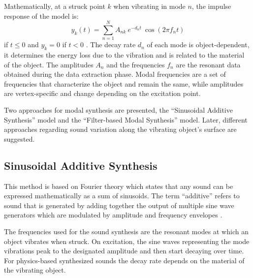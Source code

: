 
Mathematically, at a struck point $k$ when vibrating in mode $n$, the impulse response of the model is:
\begin{equation}\label{eq:modal_response}
y_k(t) = \sum\limits_{n=1}^{N} A_{nk}\ e^{-d_n t}\ \cos(2 \pi f_nt)
\end{equation}
if $t\leqslant 0$ and $y_k = 0$ if $t<0$ \cite{van2001foleyautomatic}. The decay rate $d_n$ of each mode is object-dependent, it determines the energy loss due to the vibration and is related to the material of the object. The amplitudes $A_n$ and the frequencies $f_n$ are the resonant data obtained during the data extraction phase. Modal frequencies are a set of frequencies that characterize the object and remain the same, while amplitudes are vertex-specific and change depending on the excitation point.

Two approaches for modal synthesis are presented, the ``Sinusoidal Additive Synthesis'' model and the ``Filter-based Modal Synthesis'' model. Later, different approaches regarding sound variation along the vibrating object's surface are suggested.

\subsection{Sinusoidal Additive Synthesis}\label{sec:sin_synth}

This method is based on Fourier theory which states that any sound can be expressed mathematically as a sum of sinusoids. The term ``additive'' refers to sound that is generated by adding together the output of multiple sine wave generators which are modulated by amplitude and frequency envelopes \cite{smith2011spectral}.

The frequencies used for the sound synthesis are the resonant modes at which an object vibrates when struck. On excitation, the sine waves representing the mode vibrations peak to the designated amplitude and then start decaying over time. For physics-based synthesized sounds the decay rate depends on the material of the vibrating object.%


